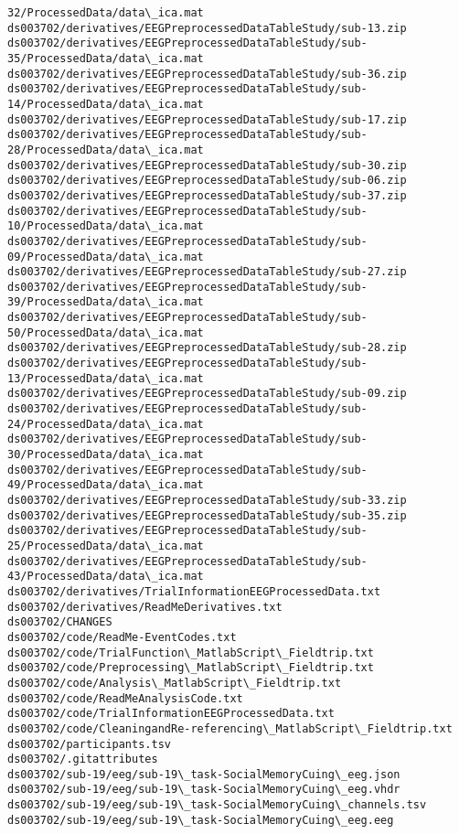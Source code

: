 \documentclass[11pt]{article}
\begin{document}
\begin{Verbatim}[commandchars=\\\{\}]
32/ProcessedData/data\_ica.mat
ds003702/derivatives/EEGPreprocessedDataTableStudy/sub-13.zip
ds003702/derivatives/EEGPreprocessedDataTableStudy/sub-
35/ProcessedData/data\_ica.mat
ds003702/derivatives/EEGPreprocessedDataTableStudy/sub-36.zip
ds003702/derivatives/EEGPreprocessedDataTableStudy/sub-
14/ProcessedData/data\_ica.mat
ds003702/derivatives/EEGPreprocessedDataTableStudy/sub-17.zip
ds003702/derivatives/EEGPreprocessedDataTableStudy/sub-
28/ProcessedData/data\_ica.mat
ds003702/derivatives/EEGPreprocessedDataTableStudy/sub-30.zip
ds003702/derivatives/EEGPreprocessedDataTableStudy/sub-06.zip
ds003702/derivatives/EEGPreprocessedDataTableStudy/sub-37.zip
ds003702/derivatives/EEGPreprocessedDataTableStudy/sub-
10/ProcessedData/data\_ica.mat
ds003702/derivatives/EEGPreprocessedDataTableStudy/sub-
09/ProcessedData/data\_ica.mat
ds003702/derivatives/EEGPreprocessedDataTableStudy/sub-27.zip
ds003702/derivatives/EEGPreprocessedDataTableStudy/sub-
39/ProcessedData/data\_ica.mat
ds003702/derivatives/EEGPreprocessedDataTableStudy/sub-
50/ProcessedData/data\_ica.mat
ds003702/derivatives/EEGPreprocessedDataTableStudy/sub-28.zip
ds003702/derivatives/EEGPreprocessedDataTableStudy/sub-
13/ProcessedData/data\_ica.mat
ds003702/derivatives/EEGPreprocessedDataTableStudy/sub-09.zip
ds003702/derivatives/EEGPreprocessedDataTableStudy/sub-
24/ProcessedData/data\_ica.mat
ds003702/derivatives/EEGPreprocessedDataTableStudy/sub-
30/ProcessedData/data\_ica.mat
ds003702/derivatives/EEGPreprocessedDataTableStudy/sub-
49/ProcessedData/data\_ica.mat
ds003702/derivatives/EEGPreprocessedDataTableStudy/sub-33.zip
ds003702/derivatives/EEGPreprocessedDataTableStudy/sub-35.zip
ds003702/derivatives/EEGPreprocessedDataTableStudy/sub-
25/ProcessedData/data\_ica.mat
ds003702/derivatives/EEGPreprocessedDataTableStudy/sub-
43/ProcessedData/data\_ica.mat
ds003702/derivatives/TrialInformationEEGProcessedData.txt
ds003702/derivatives/ReadMeDerivatives.txt
ds003702/CHANGES
ds003702/code/ReadMe-EventCodes.txt
ds003702/code/TrialFunction\_MatlabScript\_Fieldtrip.txt
ds003702/code/Preprocessing\_MatlabScript\_Fieldtrip.txt
ds003702/code/Analysis\_MatlabScript\_Fieldtrip.txt
ds003702/code/ReadMeAnalysisCode.txt
ds003702/code/TrialInformationEEGProcessedData.txt
ds003702/code/CleaningandRe-referencing\_MatlabScript\_Fieldtrip.txt
ds003702/participants.tsv
ds003702/.gitattributes
ds003702/sub-19/eeg/sub-19\_task-SocialMemoryCuing\_eeg.json
ds003702/sub-19/eeg/sub-19\_task-SocialMemoryCuing\_eeg.vhdr
ds003702/sub-19/eeg/sub-19\_task-SocialMemoryCuing\_channels.tsv
ds003702/sub-19/eeg/sub-19\_task-SocialMemoryCuing\_eeg.eeg

\end{Verbatim}
\end{document}
